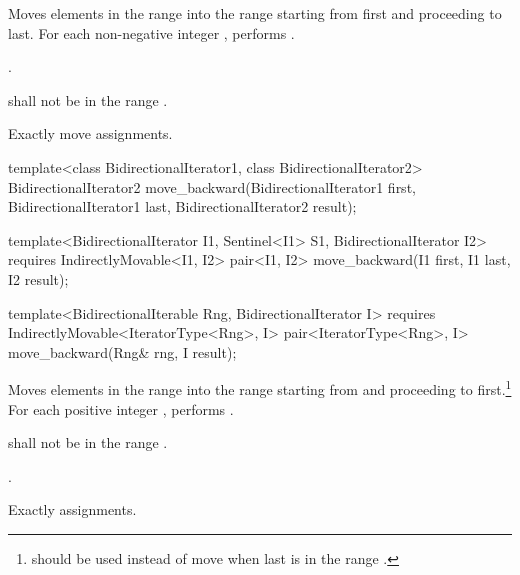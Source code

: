 \begin{itemdescr}
\pnum
\effects
Moves elements in the range 
into the range 
starting from first and proceeding to last.
For each non-negative integer
,
performs
 .

\pnum
\returns
{}.

\pnum
\requires
{}
shall not be in the range
.

\pnum
\complexity
Exactly
move assignments.
\end{itemdescr}

%
\begin{removedblock}
\begin{itemdecl}
template<class BidirectionalIterator1, class BidirectionalIterator2>
  BidirectionalIterator2
    move_backward(BidirectionalIterator1 first,
                  BidirectionalIterator1 last,
                  BidirectionalIterator2 result);
\end{itemdecl}
\end{removedblock}
\begin{addedblock}
\begin{itemdecl}
template<BidirectionalIterator I1, Sentinel<I1> S1, BidirectionalIterator I2>
  requires IndirectlyMovable<I1, I2>
  pair<I1, I2>
    move_backward(I1 first, I1 last, I2 result);

template<BidirectionalIterable Rng, BidirectionalIterator I>
  requires IndirectlyMovable<IteratorType<Rng>, I>
  pair<IteratorType<Rng>, I>
    move_backward(Rng& rng, I result);
\end{itemdecl}
\end{addedblock}

\begin{itemdescr}
\pnum
\effects
Moves elements in the range 
into the
range 
starting from
and proceeding to first.\footnote{
should be used instead of move when last
is in
the range
.}
For each positive integer
,
performs
.

\pnum
\requires
{}
shall not be in the range
.

\pnum
\returns
{}.

\pnum
\complexity
Exactly
assignments.
\end{itemdescr}

